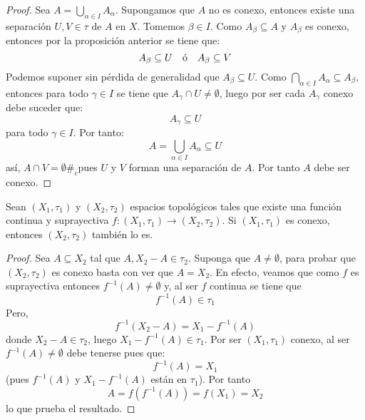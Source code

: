 \documentclass[12pt]{report}
\theoremstyle{largebreak}
\newcommand\cf[3]{\ensuremath{#1:#2\rightarrow#3}}
\newcommand\contradiction{\ensuremath{\#_c}}
\begin{document}
    \begin{proof}
        Sea $A=\bigcup_{\alpha\in I}A_\alpha$. Supongamos que $A$ no es conexo, entonces existe una separación $U,V\in\tau$ de $A$ en $X$. Tomemos $\beta\in I$. Como $A_\beta\subseteq A$ y $A_\beta$ es conexo, entonces por la proposición anterior se tiene que:
        \begin{equation*}
            A_\beta\subseteq U\quad\textup{ó}\quad A_\beta\subseteq V
        \end{equation*}
        Podemos suponer sin pérdida de generalidad que $A_\beta\subseteq U$. Como $\bigcap_{\alpha\in I}A_\alpha\subseteq A_\beta$, entonces para todo $\gamma\in I$ se tiene que $A_\gamma\cap U\neq\emptyset$, luego por ser cada $A_\gamma$ conexo debe suceder que:
        \begin{equation*}
            A_\gamma\subseteq U
        \end{equation*}
        para todo $\gamma\in I$. Por tanto:
        \begin{equation*}
            A=\bigcup_{\alpha\in I}A_\alpha\subseteq U
        \end{equation*}
        así, $A\cap V=\emptyset$\contradiction pues $U$ y $V$ forman una separación de $A$. Por tanto $A$ debe ser conexo.
    \end{proof}

    \begin{propo}
        Sean $(X_1,\tau_1)$ y $(X_2,\tau_2)$ espacios topológicos tales que existe una función continua y suprayectiva $\cf{f}{(X_1,\tau_1)}{(X_2,\tau_2)}$. Si $(X_1,\tau_1)$ es conexo, entonces $(X_2,\tau_2)$ también lo es.
    \end{propo}

    \begin{proof}
        Sea $A\subseteq X_2$ tal que $A,X_2-A\in\tau_2$. Suponga que $A\neq\emptyset$, para probar que $(X_2,\tau_2)$ es conexo basta con ver que $A=X_2$. En efecto, veamos que como $f$ es suprayectiva entonces $f^{-1}(A)\neq\emptyset$ y, al ser $f$ continua se tiene que
        \begin{equation*}
            f^{-1}(A)\in\tau_1
        \end{equation*}
        Pero,
        \begin{equation*}
            f^{-1}(X_2-A)=X_1-f^{-1}(A)
        \end{equation*}
        donde $X_2-A\in\tau_2$, luego $X_1-f^{-1}(A)\in\tau_1$. Por ser $(X_1,\tau_1)$ conexo, al ser $f^{-1}(A)\neq\emptyset$ debe tenerse pues que:
        \begin{equation*}
            f^{-1}(A)=X_1
        \end{equation*}
        (pues $f^{-1}(A)$ y $X_1-f^{-1}(A)$ están en $\tau_1$). Por tanto
        \begin{equation*}
            A=f(f^{-1}(A))=f(X_1)=X_2
        \end{equation*}
        lo que prueba el resultado.
    \end{proof}
\end{document}

